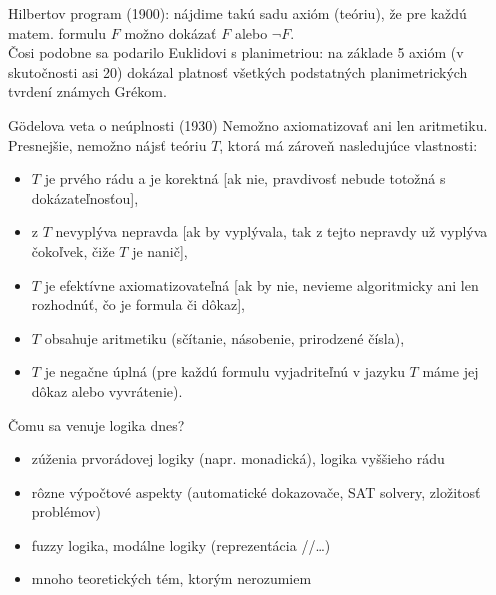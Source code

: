 \documentclass[12pt]{beamer}
\theoremstyle{definition}
\begin{document}
\begin{frame}
Hilbertov program (1900):
nájdime takú sadu axióm (teóriu), že pre každú matem. formulu $F$ možno dokázať $F$ alebo $\lnot F$.\\[5mm]
Čosi podobne sa podarilo Euklidovi s planimetriou: na základe 5 axióm (v skutočnosti asi 20)
dokázal platnosť všetkých podstatných planimetrických tvrdení známych Grékom.
\end{frame}

\begin{frame}{G\"odelova veta o neúplnosti (1930)}
Nemožno axiomatizovať ani len aritmetiku.
Presnejšie, nemožno nájsť teóriu $T$, ktorá má zároveň nasledujúce vlastnosti:
\begin{itemize}
\item $T$ je prvého rádu a je korektná [ak nie, pravdivosť nebude totožná s dokázateľnosťou],
\item z $T$ nevyplýva nepravda [ak by vyplývala, tak z tejto nepravdy už vyplýva čokoľvek, čiže $T$ je nanič],
\item $T$ je efektívne axiomatizovateľná [ak by nie, nevieme algoritmicky ani len rozhodnúť, čo je formula či dôkaz],
\item $T$ obsahuje aritmetiku (sčítanie, násobenie, prirodzené čísla),
\item $T$ je negačne úplná (pre každú formulu vyjadriteľnú v jazyku $T$ máme jej dôkaz alebo vyvrátenie).
\end{itemize}
\end{frame}

\begin{frame}{Čomu sa venuje logika dnes?}
\begin{itemize}
\item zúženia prvorádovej logiky (napr. monadická), logika vyššieho rádu
\item rôzne výpočtové aspekty (automatické dokazovače, SAT solvery, zložitosť problémov)
\item fuzzy logika, modálne logiky (reprezentácia //\dots)
\item mnoho teoretických tém, ktorým nerozumiem
\end{itemize}
\end{frame}
\end{document}
